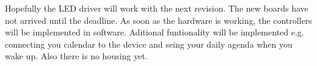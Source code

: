 Hopefully the LED driver will work with the next revision. The new boards have not arrived until the deadline. As soon as the hardware is working, the controllers will be implemented in software. 
\newpar
Aditional funtionality will be implemented e.g. connecting you calendar to the device and seing your daily agenda when you wake up. Also there is no housing yet.    
